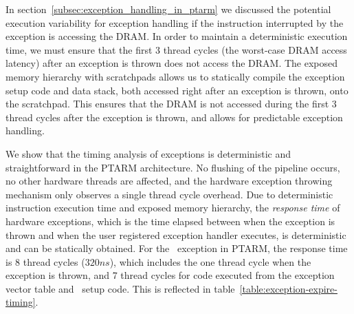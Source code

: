 In section~\ref{subsec:exception_handling_in_ptarm} we discussed the potential execution variability for exception handling if the instruction interrupted by the exception is accessing the DRAM. 
In order to maintain a deterministic execution time, we must ensure that the first 3 thread cycles (the worst-case DRAM access latency) after an exception is thrown does not access the DRAM. 
The exposed memory hierarchy with scratchpads allows us to statically compile the exception setup code and data stack, both accessed right after an exception is thrown, onto the scratchpad. 
This ensures that the DRAM is not accessed during the first 3 thread cycles after the exception is thrown, and allows for predictable exception handling.

We show that the timing analysis of exceptions is deterministic and straightforward in the PTARM architecture.
No flushing of the pipeline occurs, no other hardware threads are affected, and the hardware exception throwing mechanism only observes a single thread cycle overhead.
Due to deterministic instruction execution time and exposed memory hierarchy, the \emph{response time} of hardware exceptions, which is the time elapsed between when the exception is thrown and when the user registered exception handler executes, is deterministic and can be statically obtained. 
For the \timerexpired\ exception in PTARM, the response time is 8 thread cycles ($320ns$), which includes the one thread cycle when the exception is thrown, and 7 thread cycles for code executed from the exception vector table and \timerexpired\ setup code.   
This is reflected in table~\ref{table:exception-expire-timing}.


